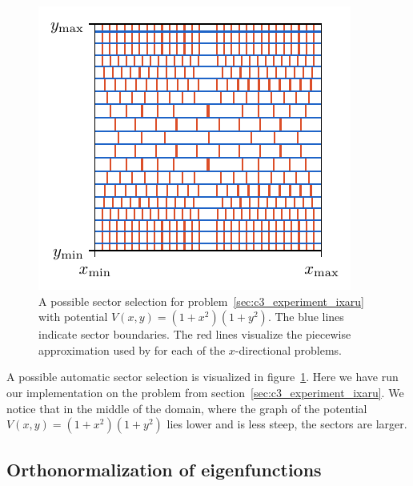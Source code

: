 \begin{figure}
  \begin{center}
    \begin{minipage}{.59\textwidth}
      \includegraphics[width=\textwidth]{img/chapter3/sector_example.pdf}
    \end{minipage}
    \begin{minipage}{.4\textwidth}
      \caption{A possible sector selection for problem~\ref{sec:c3_experiment_ixaru} with potential $V(x, y) = (1+x^2)(1+y^2)$. The blue lines indicate sector boundaries. The red lines visualize the piecewise approximation used by  for each of the $x$-directional problems.}\label{fig:c3_sector_selection_example}
    \end{minipage}
  \end{center}
\end{figure}

A possible automatic sector selection is visualized in figure~\ref{fig:c3_sector_selection_example}. Here we have run our implementation on the problem from section~\eqref{sec:c3_experiment_ixaru}. We notice that in the middle of the domain, where the graph of the potential $V(x, y) = (1+x^2)(1+y^2)$ lies lower and is less steep, the sectors are larger.

\subsection{Orthonormalization of eigenfunctions}\label{sec:c3_improvement_orthonormalization}

